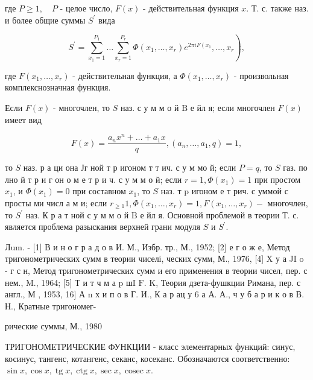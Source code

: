 \documentclass[10pt]{article}
\begin{document}
где $P \geqslant 1, \quad P$ - целое число, $F(x)$ - действительная функция $x$. Т. с. также наз. и более общие суммы $S^{\prime}$ вида



\[

\left.S^{\prime}=\sum_{x_{1}=1}^{P_{1}} \ldots \sum_{x_{r}=1}^{P_{r}} \Phi\left(x_{1}, \ldots, x_{r}\right) e^{2 \pi i F\left(x_{1}\right.}, \ldots, x_{r}\right),

\]



где $F\left(x_{1}, \ldots, x_{r}\right)$ - действительная функция, а $\Phi\left(x_{1}, \ldots, x_{r}\right)$ - произвольная комплекснозначная функция.



Если $F(x)$ - многочлен, то $S$ наз. с у м м о й $\mathrm{B}$ е йл я; если многочлен $F(x)$ имеет вид



\[

F(x)=\frac{a_{n} x^{n}+\ldots+a_{1} x}{q},\left(a_{n}, \ldots, a_{1}, q\right)=1,

\]



то $S$ наз. р а ци она Јг ной т р игоном т т ич. с у м мо й; если $P=q$, то $S$ газ. по лно й т р и г он о м е т р и ч. с у м м о й; если $r=1, \Phi\left(x_{1}\right)=1$ при простом $x_{1}$, и $\Phi\left(x_{1}\right)=0$ при составном $x_{1}$, то $S$ наз. т $\mathrm{p}$ игоном е т рич. с уммой с просты ми числ а м и; если $r_{\geqslant 1} 1, \Phi\left(x_{1}, \ldots, x_{r}\right)=1, F\left(x_{1}, \ldots, x_{r}\right)-$ многочлен, то $S^{\prime}$ наз. К р а т ной с у м м о й $\mathrm{B}$ е йл я. Основной проблемой в теории Т. с. является проблема разыскания верхней грани модуля $S$ и $S^{\prime}$.



Лum. - [1] В и н о г р а д о в И. М., Избр. тр., М., 1952; [2] е г о ж е, Метод тригонометрических сумм в теории чиселі, ческих сумм, М., 1976, [4] X у а JI o - г с н, Метод тригонометрических сумм и его применения в теории чисел, пер. с нем., M., 1964; [5] Т и т ч м а p шI $\mathrm{F}$. $\mathrm{K}$, Теория дзета-фушкции Римана, пер. с англ., М , 1953, 16] А $\mathrm{n}$ х и п о в Г. И., К а р ац у 6 а А. А., ч у б а р и к о в В. Н., Кратные тригономег-

рические суммы, М., 1980



ТРИГОНОМЕТРИЧЕСКИЕ ФУНКЦИИ - класс элементарных функций: синус, косинус, тангенс, котангенс, секанс, косеканс. Обозначаются соответственно: $\sin x, \cos x, \operatorname{tg} x, \operatorname{ctg} x, \sec x, \operatorname{cosec} x$.
\end{document}

